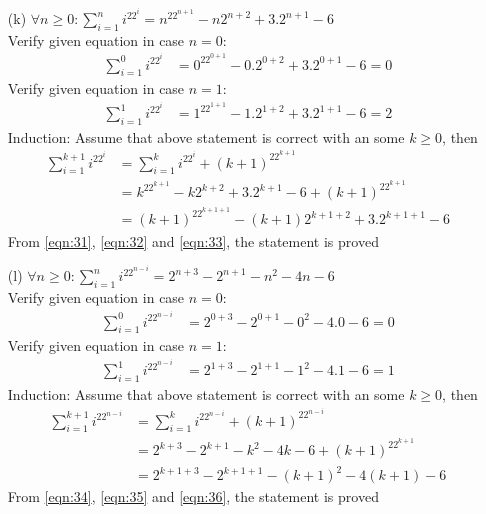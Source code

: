 \begin{enumerate}
    \newpage
    \item[(k)] $\forall n\geq 0: \displaystyle\sum^{n}_{i=1} i^22^i = n^22^{n+1}-n2^{n+2}+3.2^{n+1}-6$ \\
    Verify given equation in case $n=0$:
        \begin{align}
            \displaystyle\sum^{0}_{i=1} i^22^i &= 0^22^{0+1}-0.2^{0+2}+3.2^{0+1}-6 = 0 \label{eqn:31}
        \end{align}
    Verify given equation in case $n=1$:
        \begin{align}
            \displaystyle\sum^{1}_{i=1} i^22^i &= 1^22^{1+1}-1.2^{1+2}+3.2^{1+1}-6 = 2 \label{eqn:32}
        \end{align}
    Induction: Assume that above statement is correct with an some $k \geq 0$, then\\
    \begin{align}
        \displaystyle\sum^{k+1}_{i=1} i^22^i &= \displaystyle\sum^{k}_{i=1} i^22^i + (k+1)^22^{k+1} \\
                                        &= k^22^{k+1}-k2^{k+2}+3.2^{k+1}-6 + (k+1)^22^{k+1} \\
                                        &= (k+1)^22^{k+1+1}-(k+1)2^{k+1+2}+3.2^{k+1+1}-6 \label{eqn:33}
    \end{align}
    From \ref{eqn:31}, \ref{eqn:32} and \ref{eqn:33}, the statement is proved
    
    \item[(l)] $\forall n\geq 0: \displaystyle\sum^{n}_{i=1} i^22^{n-i} = 2^{n+3}-2^{n+1}-n^2-4n-6$ \\
    Verify given equation in case $n=0$:
        \begin{align}
            \displaystyle\sum^{0}_{i=1} i^22^{n-i} &= 2^{0+3}-2^{0+1}-0^2-4.0-6 = 0 \label{eqn:34}
        \end{align}
    Verify given equation in case $n=1$:
        \begin{align}
            \displaystyle\sum^{1}_{i=1} i^22^{n-i} &= 2^{1+3}-2^{1+1}-1^2-4.1-6 = 1 \label{eqn:35}
        \end{align}
    Induction: Assume that above statement is correct with an some $k \geq 0$, then\\
    \begin{align}
        \displaystyle\sum^{k+1}_{i=1} i^22^{n-i} &= \displaystyle\sum^{k}_{i=1} i^22^{n-i} + (k+1)^22^{n-i} \\
                                        &= 2^{k+3}-2^{k+1}-k^2-4k-6 + (k+1)^22^{k+1} \\
                                        &= 2^{k+1+3}-2^{k+1+1}-(k+1)^2-4(k+1)-6 \label{eqn:36}
    \end{align}
    From \ref{eqn:34}, \ref{eqn:35} and \ref{eqn:36}, the statement is proved
    

\end{enumerate}
